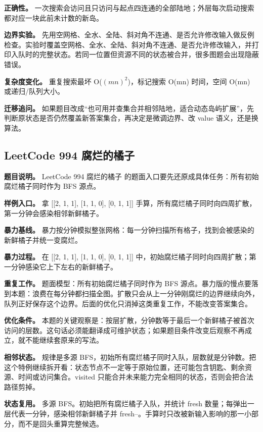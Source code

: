 \textbf{正确性。} 一次搜索会访问且只访问与起点四连通的全部陆地；外层每次启动搜索都对应一块此前未计数的新岛。

\textbf{边界实验。} 先用空网格、全水、全陆、斜对角不连通、是否允许修改输入做反例检查。实验时覆盖空网格、全水、全陆、斜对角不连通、是否允许修改输入，并打印入队时的完整状态。若同一位置但资源不同的状态被合并，很多图题会出现隐蔽错误。

\textbf{复杂度变化。} 重复搜索最坏 O(\ensuremath{(mn)^{2}})，标记搜索 O(mn) 时间，空间 O(mn) 或递归/队列大小。

\textbf{迁移追问。} 如果题目改成“也可用并查集合并相邻陆地，适合动态岛屿扩展”，先判断原状态是否仍然覆盖新答案集合，再决定是微调边界、改 value 语义，还是换算法。

\subsection{LeetCode 994 腐烂的橘子}

\textbf{题目说明。} LeetCode 994 腐烂的橘子 的题面入口要先还原成具体任务：所有初始腐烂橘子同时作为 BFS 源点。

\textbf{样例入口。} 拿 [[2, 1, 1], [1, 1, 0], [0, 1, 1]] 手算，所有腐烂橘子同时向四周扩散，第一分钟会感染相邻新鲜橘子。

\textbf{暴力基线。} 暴力按分钟模拟整张网格：每一分钟扫描所有格子，找到会被感染的新鲜橘子并统一变腐烂。

\textbf{暴力过程。} 在 [[2, 1, 1], [1, 1, 0], [0, 1, 1]] 中，初始腐烂橘子同时向四周扩散；第一分钟感染它上下左右的新鲜橘子。

\textbf{重复工作。} 题面模型：所有初始腐烂橘子同时作为 BFS 源点。暴力版的慢点要落到本题：浪费在每分钟都扫描全图。扩散只会从上一分钟刚腐烂的边界继续向外，队列正好保存这个边界。后面的优化只消掉这类重复工作，不能改变答案集合。

\textbf{优化条件。} 本题的关键观察是：按层扩散，分钟数等于最后一个新鲜橘子被首次访问的层数。这句话必须能翻译成可维护状态；如果题目条件改变后观察不再成立，就不能继续套原来的写法。

\textbf{相邻状态。} 规律是多源 BFS，初始所有腐烂橘子同时入队，层数就是分钟数。把这个特例继续拆开看：状态节点不一定等于原始位置，还可能包含钥匙、剩余资源、时间或访问集合。visited 只能合并未来能力完全相同的状态，否则会把合法路径剪掉。

\textbf{状态复用。} 多源 BFS。初始把所有腐烂橘子入队，并统计 fresh 数量；每弹出一层代表一分钟，感染相邻新鲜橘子并 fresh--。手算时只改被新输入影响的那一小部分，而不是回头重算完整候选。

